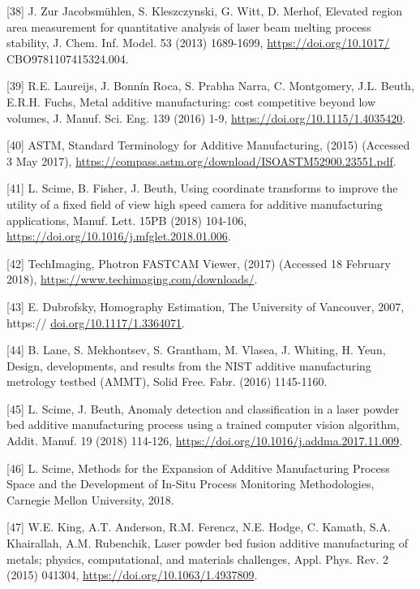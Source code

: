\documentclass[10pt]{article}
\begin{document}
[38] J. Zur Jacobsmühlen, S. Kleszczynski, G. Witt, D. Merhof, Elevated region area measurement for quantitative analysis of laser beam melting process stability, J. Chem. Inf. Model. 53 (2013) 1689-1699, \href{https://doi.org/10.1017/}{https://doi.org/10.1017/} CBO9781107415324.004.

[39] R.E. Laureijs, J. Bonnín Roca, S. Prabha Narra, C. Montgomery, J.L. Beuth, E.R.H. Fuchs, Metal additive manufacturing: cost competitive beyond low volumes, J. Manuf. Sci. Eng. 139 (2016) 1-9, \href{https://doi.org/10.1115/1.4035420}{https://doi.org/10.1115/1.4035420}.

[40] ASTM, Standard Terminology for Additive Manufacturing, (2015) (Accessed 3 May 2017), \href{https://compass.astm.org/download/ISOASTM52900.23551.pdf}{https://compass.astm.org/download/ISOASTM52900.23551.pdf}.

[41] L. Scime, B. Fisher, J. Beuth, Using coordinate transforms to improve the utility of a fixed field of view high speed camera for additive manufacturing applications, Manuf. Lett. 15PB (2018) 104-106, \href{https://doi.org/10.1016/j.mfglet.2018.01.006}{https://doi.org/10.1016/j.mfglet.2018.01.006}.

[42] TechImaging, Photron FASTCAM Viewer, (2017) (Accessed 18 February 2018), \href{https://www.techimaging.com/downloads/}{https://www.techimaging.com/downloads/}.

[43] E. Dubrofsky, Homography Estimation, The University of Vancouver, 2007, https:// \href{http://doi.org/10.1117/1.3364071}{doi.org/10.1117/1.3364071}.

[44] B. Lane, S. Mekhontsev, S. Grantham, M. Vlasea, J. Whiting, H. Yeun, Design, developments, and results from the NIST additive manufacturing metrology testbed (AMMT), Solid Free. Fabr. (2016) 1145-1160.

[45] L. Scime, J. Beuth, Anomaly detection and classification in a laser powder bed additive manufacturing process using a trained computer vision algorithm, Addit. Manuf. 19 (2018) 114-126, \href{https://doi.org/10.1016/j.addma.2017.11.009}{https://doi.org/10.1016/j.addma.2017.11.009}.

[46] L. Scime, Methods for the Expansion of Additive Manufacturing Process Space and the Development of In-Situ Process Monitoring Methodologies, Carnegie Mellon University, 2018.

[47] W.E. King, A.T. Anderson, R.M. Ferencz, N.E. Hodge, C. Kamath, S.A. Khairallah, A.M. Rubenchik, Laser powder bed fusion additive manufacturing of metals; physics, computational, and materials challenges, Appl. Phys. Rev. 2 (2015) 041304, \href{https://doi.org/10.1063/1.4937809}{https://doi.org/10.1063/1.4937809}.
\end{document}
